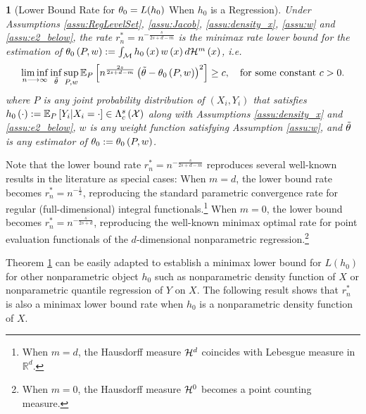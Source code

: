 \documentclass[12pt,american]{article}
\theoremstyle{definition}
\theoremstyle{plain}
\theoremstyle{definition}
\theoremstyle{plain}
\theoremstyle{plain}
\newtheorem{thm}{\protect\theoremname}
\theoremstyle{plain}
\theoremstyle{plain}
\newtheorem{rem}{\protect\remarkname}
\theoremstyle{plain}
\newcommand{\R}{\mathbb{R}}
\newcommand{\E}{\mathbb{E}}
\providecommand{\theoremname}{Theorem}
\providecommand{\remarkname}{Remark}
\providecommand{\theoremname}{Theorem}
\begin{document}
\begin{thm}[Lower Bound Rate for $\theta_0=L(h_0)$ When $h_0$ is a Regression]
  \label{thm:LB-reg}
  Under Assumptions \ref{assu:RegLevelSet}, \ref{assu:Jacob}, \ref{assu:density_x}, \ref{assu:w} and \ref{assu:e2_below}, the rate
  $r^*_{n}=n^{-\frac{s}{2s+d-m}}$ is the minimax rate lower bound for the estimation of  $\theta_{0}\left(P,w\right):=\int_{{\cal M}}h_{0}\left(x\right)w\left(x\right)d{\cal H}^{m}\left(x\right)$, i.e.
  \[
    \liminf_{n\longrightarrow\infty}\inf_{\tilde{\t}}\sup_{P,w}\E_{P}\left[n^{\frac{2s}{2s+d-m}}\left(\tilde{\t}-\t_{0}\left(P,w\right)\right)^{2}\right]\geq c,\quad\text{for some constant }c>0.
  \]
  where $P$ is any joint probability distribution of $\left(X_{i},Y_{i}\right)$
  that satisfies $h_{0}\left(\cd\right):=\E_{P}\left[Y_{i}|X_{i}=\cdot\right]\in\Lambda_{c}^{s}\left(\mathcal{X}\right)$
  along with Assumptions \ref{assu:density_x} and \ref{assu:e2_below}, $w$ is any weight function satisfying Assumption \ref{assu:w},
  and $\tilde{\theta}$ is any estimator of $\theta_{0}:=\theta_{0}\left(P,w\right)$.
\end{thm}

Note that the lower bound rate $r^*_{n}=n^{-\frac{s}{2s+d-m}}$ reproduces
several well-known results in the literature as special cases:
When $m=d$, the lower bound rate becomes $r^*_{n}=n^{-\frac{1}{2}}$,
reproducing the standard parametric convergence rate for regular (full-dimensional)
integral functionals.\footnote{When $m=d$, the Hausdorff measure ${\cal H}^{d}$ coincides with Lebesgue
measure in $\R^{d}$.} When $m=0$, the lower bound becomes $r^*_{n}=n^{-\frac{s}{2s+d}}$,
reproducing the well-known \citep{stone1980optimal} minimax optimal
rate for point evaluation functionals of the $d$-dimensional nonparametric
regression.\footnote{When $m=0$, the Hausdorff measure ${\cal H}^{0}$ becomes a point
counting measure.}

Theorem \ref{thm:LB-reg} can be easily adapted to establish a minimax lower bound for $L(h_0)$ for other nonparametric object $h_0$ such as nonparametric density function of $X$ or nonparametric quantile regression of $Y$ on $X$. The following result shows that $r^*_n$ is also a minimax lower bound rate when $h_0$ is a nonparametric density function of $X$.
\end{document}
